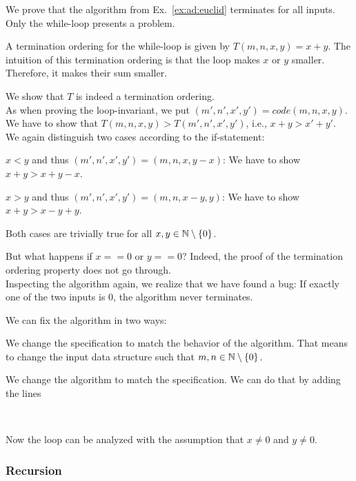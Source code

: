 \begin{example}\label{ex:ad:euclid:term}
We prove that the algorithm from Ex.~\ref{ex:ad:euclid} terminates for all inputs.
Only the while-loop presents a problem.

A termination ordering for the while-loop is given by $T(m,n,x,y)=x+y$.
The intuition of this termination ordering is that the loop makes $x$ or $y$ smaller.
Therefore, it makes their sum smaller.
\medskip

We show that $T$ is indeed a termination ordering.\\
As when proving the loop-invariant, we put $(m',n',x',y')=code(m,n,x,y)$.\\
We have to show that $T(m,n,x,y)>T(m',n',x',y')$, i.e., $x+y>x'+y'$.\\
We again distinguish two cases according to the if-statement:
\begin{compactitem}
 \item $x<y$ and thus $(m',n',x',y')=(m,n,x,y-x)$: We have to show $x+y>x+y-x$.
 \item $x>y$ and thus $(m',n',x',y')=(m,n,x-y,y)$: We have to show $x+y>x-y+y$.
\end{compactitem}
Both cases are trivially true for all $x,y\in\mathbb{N}\setminus\{0\}$.

But what happens if $x==0$ or $y==0$?
Indeed, the proof of the termination ordering property does not go through.\\
Inspecting the algorithm again, we realize that we have found a bug: If exactly one of the two inputs is $0$, the algorithm never terminates.

We can fix the algorithm in two ways:
\begin{compactitem}
 \item We change the specification to match the behavior of the algorithm.
 That means to change the input data structure such that $m,n\in\mathbb{N}\setminus\{0\}$.
 \item We change the algorithm to match the specification.
  We can do that by adding the lines
  \begin{acode}
    \\
  \end{acode}
  Now the loop can be analyzed with the assumption that $x\neq 0$ and $y\neq 0$.
\end{compactitem}
\end{example}

\subsubsection{Recursion}

